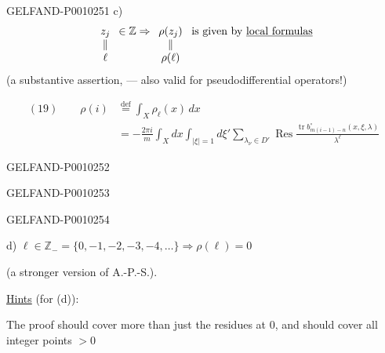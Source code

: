 \begin{GelfandAdjacentEvidence}{GELFAND-P001025}{1}
c)
\[
\begin{array}[t]{c}z_j\\\Vert\\\ell\end{array}
\in\mathbb Z\Rightarrow
\begin{array}[t]{c}\rho(z_j)\\\Vert\\\rho(\ell)\end{array}
\text{ is given by }\underline{\text{local formulas}}
\]
(a substantive assertion, --- also valid for pseudodifferential operators!)

\[
\begin{aligned}
(19)\qquad
\rho(i)&\overset{\mathrm{def}}{=}\int_X\rho_\ell(x)\,dx\\
&=-\frac{2\pi i}{m}\int_X dx\int_{|\xi|=1}d\xi'
\sum_{\lambda_\nu\in D'}\operatorname{Res}
\frac{\operatorname{tr}b^\circ_{m(i-1)-n}(x,\xi,\lambda)}{\lambda^\ell}
\end{aligned}
\]
\end{GelfandAdjacentEvidence}
\begin{GelfandAdjacentEvidence}{GELFAND-P001025}{2}

\end{GelfandAdjacentEvidence}
\begin{GelfandAdjacentEvidence}{GELFAND-P001025}{3}

\end{GelfandAdjacentEvidence}
\begin{GelfandAdjacentEvidence}{GELFAND-P001025}{4}


d) $\ell\in\mathbb Z_-=\{0,-1,-2,-3,-4,\ldots\}\Rightarrow\rho(\ell)=0$

(a stronger version of A.-P.-S.).

\underline{Hints} (for (d)):

The proof should cover more than just the residues at $0$, and should cover all integer points $>0$
\end{GelfandAdjacentEvidence}
